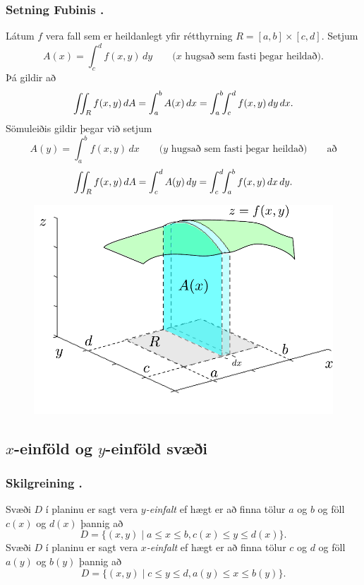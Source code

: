 \subsubsection{Setning Fubinis \kaflanr.}

Látum $f$ vera fall sem er heildanlegt yfir rétthyrning $R=[a,b]\times
[c,d]$. Setjum
$$A(x)=\int_c^d f(x,y)\,dy\qquad\mbox{($x$ hugsað sem fasti þegar heildað)}.$$
Þá gildir að 
$$\int\!\!\!\int_R f(x,y)\,dA=\int_a^b A(x)\,dx=\int_a^b\!\!\int_c^d
f(x,y)\,dy\,dx.$$
Sömuleiðis gildir þegar við setjum 
$$A(y)=\int_a^b f(x,y)\,dx\qquad\mbox{($y$ hugsað sem fasti þegar heildað)} \qquad \text{að}$$
$$\int\!\!\!\int_R f(x,y)\,dA=\int_c^d A(y)\,dy=\int_c^d\!\!\int_a^b
f(x,y)\,dx\,dy.$$



    \begin {figure}[h!]
 \centering
            \includegraphics[width=0.6\linewidth]{ax1}
            \caption*{}
\end {figure}



\subsection{$x$-einföld og $y$-einföld svæði} 

\subsubsection{Skilgreining \kaflanr.}
Svæði $D$ í planinu er sagt vera {\em
  $y$-einfalt}  ef hægt er að finna tölur $a$ og $b$ og föll $c(x)$ og
$d(x)$ þannig að  
$$D=\{(x,y)\mid a\leq x\leq b, c(x)\leq y\leq d(x)\}.$$
Svæði $D$ í planinu er sagt vera {\em $x$-einfalt}  ef hægt er að
finna tölur $c$ og $d$ og föll $a(y)$ og $b(y)$ þannig að  
$$D=\{(x,y)\mid c\leq y\leq d, a(y)\leq x\leq b(y)\}.$$

